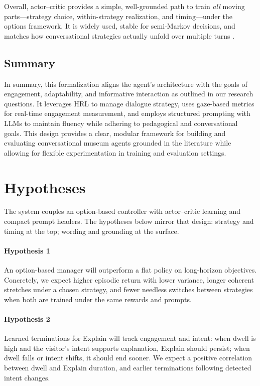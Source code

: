\documentclass[12pt]{article}
\begin{document}
Overall, actor--critic provides a simple, well-grounded path to train \emph{all} moving parts---strategy choice, within-strategy realization, and timing---under the options framework. It is widely used, stable for semi-Markov decisions, and matches how conversational strategies actually unfold over multiple turns \citep{sutton1999between,bacon2017option,schulman2017ppo-openreview,haarnoja2018sac,kumar2020conservative}.

\subsection{Summary}

In summary, this formalization aligns the agent’s architecture with the goals of engagement, adaptability, and informative interaction as outlined in our research questions. It leverages HRL to manage dialogue strategy, uses gaze-based metrics for real-time engagement measurement, and employs structured prompting with LLMs to maintain fluency while adhering to pedagogical and conversational goals. This design provides a clear, modular framework for building and evaluating conversational museum agents grounded in the literature while allowing for flexible experimentation in training and evaluation settings.

\section{Hypotheses} 
The system couples an option-based controller with actor–critic learning and compact prompt headers. The hypotheses below mirror that design: strategy and timing at the top; wording and grounding at the surface.

\paragraph{Hypothesis 1}

An option-based manager will outperform a flat policy on long-horizon objectives. Concretely, we expect higher episodic return with lower variance, longer coherent stretches under a chosen strategy, and fewer needless switches between strategies when both are trained under the same rewards and prompts. 

\paragraph{Hypothesis 2}

Learned terminations for Explain will track engagement and intent: when dwell is high and the visitor’s intent supports explanation, Explain should persist; when dwell falls or intent shifts, it should end sooner. We expect a positive correlation between dwell and Explain duration, and earlier terminations following detected intent changes.
\end{document}
